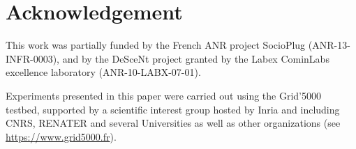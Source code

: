 \section*{Acknowledgement}

This work was partially funded by the French ANR project SocioPlug
(ANR-13-INFR-0003), and by the DeSceNt project granted by the Labex CominLabs
excellence laboratory (ANR-10-LABX-07-01).

Experiments presented in this paper were carried out using the Grid'5000
testbed, supported by a scientific interest group hosted by Inria and including
CNRS, RENATER and several Universities as well as other organizations (see
\url{https://www.grid5000.fr}).
